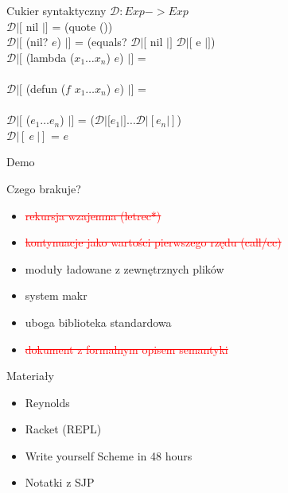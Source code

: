 \documentclass[12pt,serif]{beamer}
\begin{document}
\begin{frame}{Cukier syntaktyczny}
$\mathcal{D} : Exp -> Exp$ \newline
\\
$\mathcal{D}|[$ nil $|]$ = (quote ()) \\
$\mathcal{D}|[$ (nil? $e$) $|]$ = 
   (equals? $\mathcal{D}|[$ nil $|]$ $\mathcal{D}|[$ e $|]$) \newline
\\
$\mathcal{D}|[$ (lambda ($x_1 \ldots x_n$) $e$) $|]$ = \\
\newline
\\
$\mathcal{D}|[$ (defun ($f$ $x_1 \ldots x_n$) $e$) $|]$ = \\ 
\newline
\\
$\mathcal{D}|[$ ($e_1 \ldots e_n$) $|]$ =
  ($\mathcal{D}|[e_1|] \ldots \mathcal{D}|[e_n|] $)\\
$\mathcal{D}|[~e~|]$ = $e$

\end{frame}


\begin{frame}
\begin{center}
   \LARGE{Demo}
\end{center}
\end{frame}

\begin{frame}{Czego brakuje?}
\begin{itemize}
   \item \textcolor{red}{\sout{rekursja wzajemna (letrec*)}}
   \item \textcolor{red}{\sout{kontynuacje jako wartości pierwszego rzędu (call/cc)}}
   \item moduły ładowane z zewnętrznych plików
   \item system makr
   \item uboga biblioteka standardowa
   \item \textcolor{red}{\sout{dokument z formalnym opisem semantyki}}
\end{itemize}
\end{frame}

\begin{frame}{Materiały}
\begin{itemize}
   \item Reynolds
   \item Racket (REPL)
   \item Write yourself Scheme in 48 hours
   \item Notatki z SJP
\end{itemize}
\end{frame}
\end{document}
